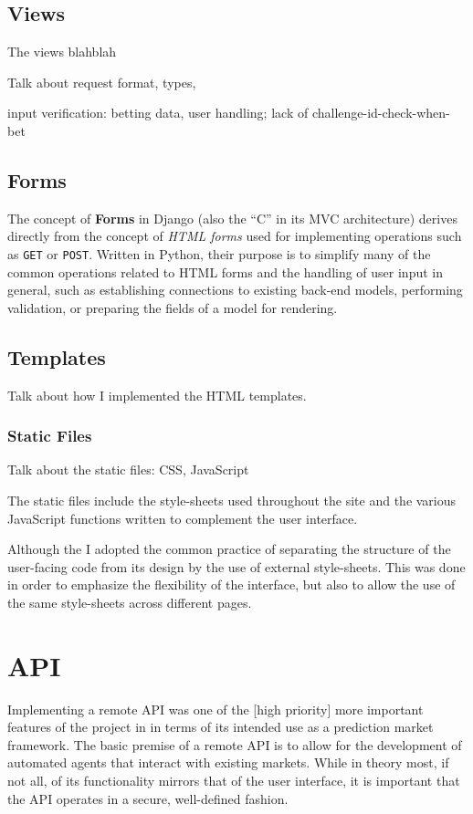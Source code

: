\documentclass[bsc,frontabs,twoside,singlespacing,parskip,deptreport]{infthesis}     %
\begin{document}
	


\subsection{Views}
	The views blahblah

Talk about request format, types, 

input verification: betting data, user handling; lack of challenge-id-check-when-bet

\subsection{Forms}
	The concept of {\bf Forms} in Django (also the ``C'' in its MVC architecture) derives directly from the concept of {\em HTML forms} used for implementing operations such as {\tt GET} or {\tt POST}. Written in Python, their purpose is to simplify many of the common operations related to HTML forms and the handling of user input in general, such as establishing connections to existing back-end models, performing validation, or preparing the fields of a model for rendering. 


\subsection{Templates}
 Talk about how I implemented the HTML templates. 

\subsubsection{Static Files}
Talk about the static files: CSS, JavaScript

	The static files include the style-sheets used throughout the site and the various JavaScript functions written to complement the user interface. 

	Although the  I adopted the common practice of separating the structure of the user-facing code from its design by the use of external style-sheets. This was done in order to emphasize the flexibility of the interface, but also to allow the use of the same style-sheets across different pages. 

	

\section{API}
    
    Implementing a remote API was one of the [high priority] more important features of the project in in terms of its intended use as a prediction market framework. The basic premise of a remote API is to allow for the development of automated agents that interact with existing markets. While in theory most, if not all, of its functionality mirrors that of the user interface, it is important that the API operates in a secure, well-defined fashion.
    
\end{document}
